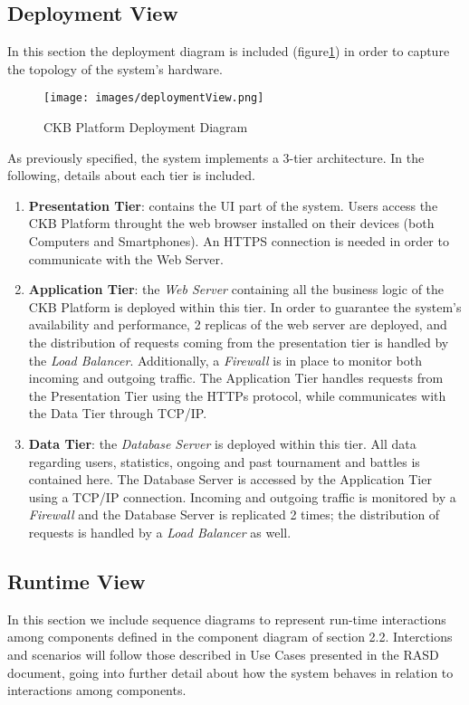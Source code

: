 \documentclass[a4paper, 11pt, titlepage]{article}
\begin{document}
\subsection{Deployment View}
In this section the deployment diagram is included (figure\ref{fig:deployment_diag}) in order to capture the topology of the system's hardware.

\begin{figure}[H]
  \centering
  \texttt{[image: images/deploymentView.png]}
  \caption{CKB Platform Deployment Diagram}
  \label{fig:deployment_diag}
  
\end{figure}

As previously specified, the system implements a 3-tier architecture. In the following, details about each tier is included.
\begin{enumerate}
  \item \textbf{Presentation Tier}: contains the UI part of the system. Users access the CKB Platform throught the web browser installed on their devices (both Computers and Smartphones). An HTTPS connection is needed in order to communicate with the Web Server.
  \item \textbf{Application Tier}: the \textit{Web Server} containing all the business logic of the CKB Platform is deployed within this tier. In order to guarantee the system's availability and performance, 2 replicas of the web server are deployed, and the distribution of requests coming from the presentation tier is handled by the \textit{Load Balancer}. Additionally, a \textit{Firewall} is in place to monitor both incoming and outgoing traffic. The Application Tier handles requests from the Presentation Tier using the HTTPs protocol, while communicates with the Data Tier through TCP/IP.
  \item \textbf{Data Tier}: the \textit{Database Server} is deployed within this tier. All data regarding users, statistics, ongoing and past tournament and battles is contained here. The Database Server is accessed by the Application Tier using a TCP/IP connection. Incoming and outgoing traffic is monitored by a \textit{Firewall} and the Database Server is replicated 2 times; the distribution of requests is handled by a \textit{Load Balancer} as well.
\end{enumerate}

\newpage

\subsection{Runtime View}
In this section we include sequence diagrams to represent run-time interactions among components defined in the component diagram of section 2.2.
Interctions and scenarios will follow those described in Use Cases presented in the RASD document, going into further detail about how the system behaves in relation to 
interactions among components.
\end{document}
